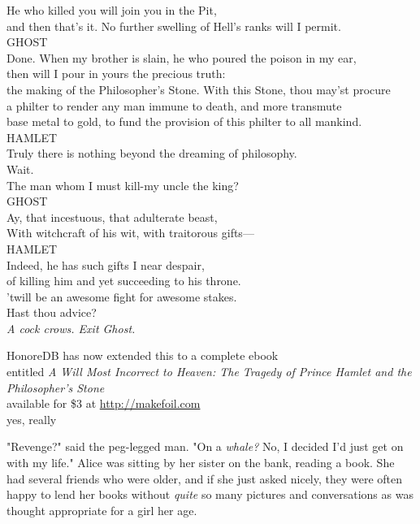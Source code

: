 \noindent{}He who killed you will join you in the Pit,\\
and then that's it. No further swelling of Hell's ranks will I permit.\\

\noindent{}GHOST\\
Done. When my brother is slain, he who poured the poison in my ear,\\
then will I pour in yours the precious truth:\\
the making of the Philosopher's Stone. With this Stone, thou may'st procure\\
a philter to render any man immune to death, and more transmute\\
base metal to gold, to fund the provision of this philter to all mankind.\\

\noindent{}HAMLET\\
Truly there is nothing beyond the dreaming of philosophy.\\
Wait.\\
The man whom I must kill-my uncle the king?\\

\noindent{}GHOST\\
Ay, that incestuous, that adulterate beast,\\
With witchcraft of his wit, with traitorous gifts—\\

\noindent{}HAMLET\\
Indeed, he has such gifts I near despair,\\
of killing him and yet succeeding to his throne.\\
'twill be an awesome fight for awesome stakes.\\
Hast thou advice?\\

\emph{A cock crows. Exit Ghost.}

\begin{center}
HonoreDB has now extended this to a complete ebook\\
entitled \emph{A Will Most Incorrect to Heaven: The Tragedy of Prince Hamlet and
the Philosopher's Stone}\\
available for \$3 at \url{http://makefoil.com}\\
yes, really
\end{center}
\sbreak
"Revenge?" said the peg-legged man. "On a \emph{whale?} No, I decided I'd just
get on with my life."
\sbreak
Alice was sitting by her sister on the bank, reading a book. She had several
friends who were older, and if she just asked nicely, they were often happy to
lend her books without \emph{quite} so many pictures and conversations as was
thought appropriate for a girl her age.

